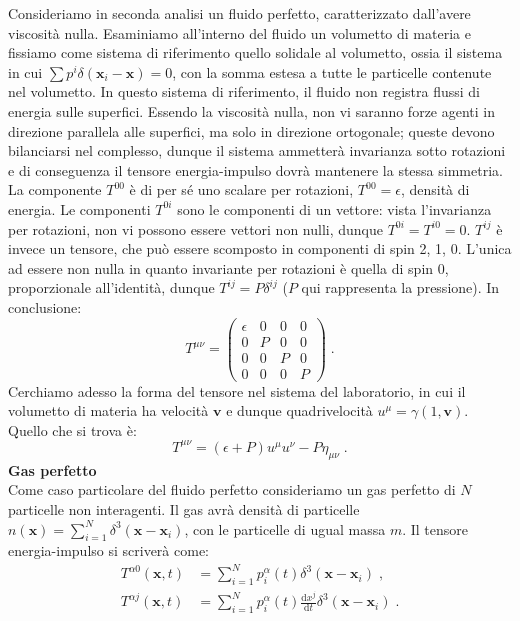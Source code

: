 \documentclass[12pt,a4paper]{report}
\theoremstyle{definition}
\newcommand{\diff}[1][]{\mathrm{d}#1}
\begin{document}
Consideriamo in seconda analisi un fluido perfetto, caratterizzato dall'avere viscosità nulla. Esaminiamo all'interno del fluido un volumetto di materia e fissiamo come sistema di riferimento quello solidale al volumetto, ossia il sistema in cui $\sum p^i\delta(\mathbf{x}_i-\mathbf{x})=0$, con la somma estesa a tutte le particelle contenute nel volumetto. In questo sistema di riferimento, il fluido non registra flussi di energia sulle superfici. Essendo la viscosità nulla, non vi saranno forze agenti in direzione parallela alle superfici, ma solo in direzione ortogonale; queste devono bilanciarsi nel complesso, dunque il sistema ammetterà invarianza sotto rotazioni e di conseguenza il tensore energia-impulso dovrà mantenere la stessa simmetria. La componente $T^{00}$ è di per sé uno scalare per rotazioni, $T^{00}=\epsilon$, densità di energia. Le componenti $T^{0i}$ sono le componenti di un vettore: vista l'invarianza per rotazioni, non vi possono essere vettori non nulli, dunque $T^{0i}=T^{i0}=0$. $T^{ij}$ è invece un tensore, che può essere scomposto in componenti di spin 2, 1, 0. L'unica ad essere non nulla in quanto invariante per rotazioni è quella di spin 0, proporzionale all'identità, dunque $T^{ij}=P\delta^{ij}$ ($P$ qui rappresenta la pressione). In conclusione:
\begin{equation}
T^{\mu\nu}=\left(\begin{matrix}\epsilon & 0 & 0 & 0 \\
0 & P & 0 & 0 \\
0 & 0 & P & 0 \\
0 & 0 & 0 & P
\end{matrix}\right)\;.
\end{equation}
Cerchiamo adesso la forma del tensore nel sistema del laboratorio, in cui il volumetto di materia ha velocità $\mathbf{v}$ e dunque quadrivelocità $u^{\mu}=\gamma(1,\mathbf{v})$. Quello che si trova è:
\begin{equation}
T^{\mu\nu}=(\epsilon+P)u^{\mu}u^{\nu}-P\eta_{\mu\nu}\;.
\end{equation}
\textbf{Gas perfetto} \\
Come caso particolare del fluido perfetto consideriamo un gas perfetto di $N$ particelle non interagenti. Il gas avrà densità di particelle $n(\mathbf{x})=\sum_{i=1}^N \delta^3(\mathbf{x}-\mathbf{x}_i)$, con le particelle di ugual massa $m$. Il tensore energia-impulso si scriverà come:
\begin{align*}
T^{\alpha 0}(\mathbf{x},t)&= \sum_{i=1}^N p_i^{\alpha}(t)\delta^3(\mathbf{x}-\mathbf{x}_i)\;, \\
T^{\alpha j}(\mathbf{x},t)&= \sum_{i=1}^N p_i^{\alpha}(t)\frac{\diff{x^j}}{\diff{t}}\delta^3(\mathbf{x}-\mathbf{x}_i)\;.
\end{align*}
\end{document}
